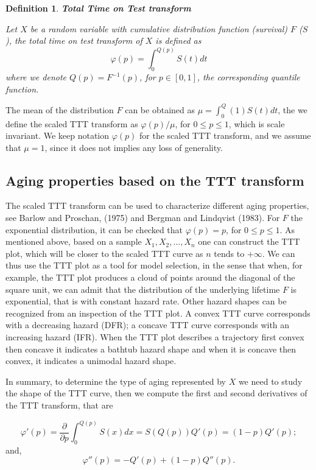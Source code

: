 \documentclass[preprint,12pt]{elsarticle}
\newtheorem{dfn}{{\sc Definition}}[section]
\begin{document}
\begin{dfn}\label{ttt.t} \textbf{Total Time on Test transform}

\noindent Let $X$ be a random variable with cumulative distribution function (survival) $F$ ($S$), the \textit{total time on test transform} of $X$ is defined as
\[
\varphi(p) =\int_0^{Q(p)}S(t) dt
\]
where we denote $Q(p)= F^{-1}(p)$, for $p\in [0,1]$, the corresponding quantile function.
\end{dfn}
The mean of the distribution $F$ can be obtained as $\mu=\int_0^Q(1) S(t)dt$, the we define the scaled TTT transform as $\varphi(p)/\mu$, for $0 \leq p \leq 1$,  which is scale invariant. We keep notation $\varphi(p)$ for the scaled TTT transform, and we assume that $\mu=1$, since it does not implies any loss of generality.


\subsection{Aging properties based on the TTT transform}

The scaled TTT transform can be used to characterize different aging properties, see Barlow and Proschan, (1975) and Bergman and Lindqvist (1983). For $F$ the exponential distribution, it can be checked that $\varphi(p)=p$, for $0 \leq p \leq 1$. As mentioned above, based on a sample $X_1,X_2,\ldots, X_n$ one can construct the TTT plot, which will be closer to the scaled TTT curve as $n$ tends to $+\infty$. We can thus use the TTT plot as a tool for model selection, in the sense that when, for example, the TTT plot produces a cloud of points around the diagonal of the square unit, we can admit that the distribution of the underlying lifetime $F$ is exponential, that is with constant hazard rate. Other hazard shapes can be recognized from an inspection of the TTT plot. A convex TTT curve corresponds with a decreasing hazard (DFR); a concave TTT curve corresponds with an increasing hazard (IFR). When the TTT plot describes a trajectory first convex then concave it indicates a bathtub hazard shape and when it is concave then convex, it indicates a unimodal hazard shape. 

In summary, to determine the type of aging represented by $X$ we need to study the shape of the TTT curve, then we compute the first and second derivatives of the TTT transform, that are

\[
\varphi'(p)= \frac{\partial}{\partial p}\int_0^{Q(p)}S(x)dx=S\left(Q(p)\right)Q'(p)=(1-p)Q'(p); 
\]
and,
\[
\varphi''(p)= -Q'(p)+(1-p)Q''(p). 
\]
\end{document}

